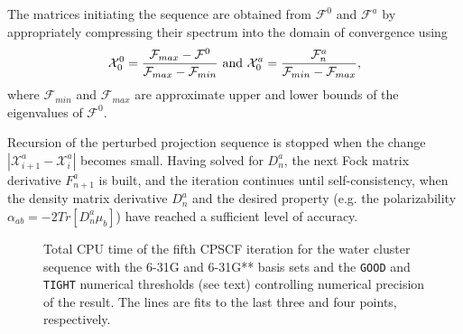 \documentclass[prl,aps,twocolumn,showpacs,twocolumngrid,superbib]{revtex4}
\begin{document}
The matrices initiating the sequence are obtained from $\mathcal{F}^0$
and  $\mathcal{F}^a$ by appropriately 
compressing their spectrum into the domain of convergence \cite{ANiklasson02A} using
\begin{equation}
\mathcal{X}^0_{0}=\frac{\mathcal{F}_{max}-\mathcal{F}^0}{\mathcal{F}_{max}-\mathcal{F}_{min}}~{\rm and}~
\mathcal{X}^a_{0}=\frac{\mathcal{F}^a_{n}}{\mathcal{F}_{min}-\mathcal{F}_{max}},
\end{equation}
where $\mathcal{F}_{min}$ and $\mathcal{F}_{max}$ are approximate upper and lower bounds of the eigenvalues of $\mathcal{F}^0$.

Recursion of the perturbed projection sequence is stopped when the change 
$\left| \mathcal{X}^a_{i+1}-\mathcal{X}^a_i \right|$ becomes small. Having solved for $D^a_n$, 
the next Fock matrix derivative $F^a_{n+1}$ is built, and the iteration continues until 
self-consistency, when the density matrix derivative $D^a_n$ and the desired property 
(e.g. the polarizability $\alpha_{ab}=-2Tr[D^a_n\mu_b]$) have reached a sufficient level of accuracy.

\begin{figure}[t]
\caption{\protect  Total CPU time of the fifth CPSCF iteration for the water cluster sequence with 
         the 6-31G and 6-31G** basis sets and the {\tt GOOD} and {\tt TIGHT} numerical thresholds (see text) 
         controlling numerical precision of the result.  The lines are fits to the last three and four points, respectively.}\label{scaling}
\end{figure}
\end{document}
